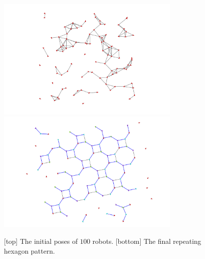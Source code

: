 \begin{figure}
    \centering
   \includegraphics[trim=5cm 0cm 5cm 0cm, clip=true, width=0.8\textwidth]{figs/octsq100_init.png}
   \bigskip
   \includegraphics[trim=5cm 0cm 5cm 0cm, clip=true, width=0.8\textwidth]{figs/octsq100_final.png}
   \caption{[top] The initial poses of $100$ robots. [bottom] The final repeating hexagon pattern.}
   \label{fig:octagonsquare-init-final}
\end{figure}

